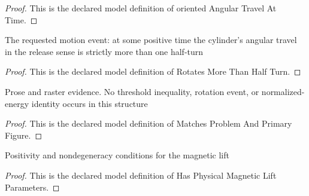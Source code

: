 \begin{proof}
  This is the declared model definition of oriented Angular Travel At Time.
\end{proof}
\begin{definition}
  \label{def:physics:phyx-mini-0954:phyxminiproblems-problemphyxmini0954-rotatesmorethanhalfturn}
  The requested motion event: at some positive time the cylinder's angular travel in the release sense is strictly more than one half-turn
\end{definition}
\begin{proof}
  This is the declared model definition of Rotates More Than Half Turn.
\end{proof}
\begin{definition}
  \label{def:physics:phyx-mini-0954:phyxminiproblems-problemphyxmini0954-matchesproblemandprimaryfigure}
  Prose and raster evidence. No threshold inequality, rotation event, or normalized-energy identity occurs in this structure
\end{definition}
\begin{proof}
  This is the declared model definition of Matches Problem And Primary Figure.
\end{proof}
\begin{definition}
  \label{def:physics:phyx-mini-0954:phyxminiproblems-problemphyxmini0954-hasphysicalmagneticliftparameters}
  Positivity and nondegeneracy conditions for the magnetic lift
\end{definition}
\begin{proof}
  This is the declared model definition of Has Physical Magnetic Lift Parameters.
\end{proof}
